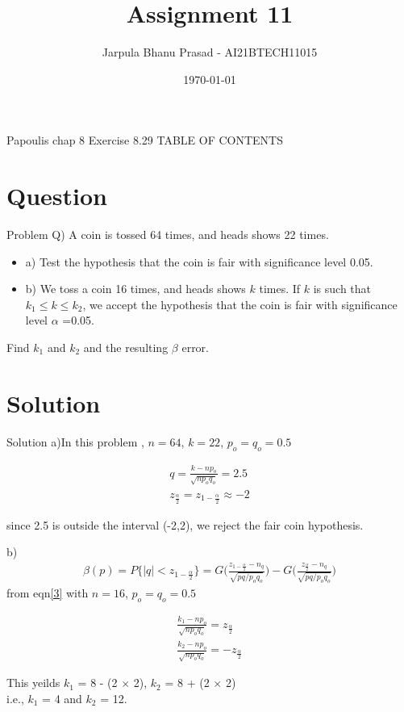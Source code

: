 \documentclass{beamer}
\title{Assignment 11}
\author{Jarpula Bhanu Prasad - AI21BTECH11015}
\date{\today}
\begin{document}
\begin{frame}
    \titlepage 
\end{frame}

\logo{}


\begin{frame}{Papoulis chap 8 Exercise 8.29}
TABLE OF CONTENTS
    \tableofcontents
\end{frame}


\section{Question}
\begin{frame}{Problem}
Q) A coin is tossed 64 times, and heads shows 22 times.
\begin{itemize}
    \item a) Test the hypothesis that the coin is fair with significance level 0.05.
    \item b) We toss a coin 16 times, and heads shows $k$ times. If $k$ is such that $k_1 \le k \le k_2$, we accept the hypothesis that the coin is fair with significance level $\alpha$ =0.05. 
\end{itemize}
Find $k_1$ and $k_2$ and the resulting $\beta$ error.
\end{frame}

\section{Solution}
\begin{frame}{Solution}
   a)In this problem , $n=64$, $k=22$, $p_o = q_o =0.5$

   \begin{align} 
       q = \frac{k-np_o}{\sqrt{np_oq_o}} = 2.5 \\
       z_{\frac{\alpha}{2}} =   z_{1-\frac{\alpha}{2}} \approx -2 
   \end{align}

   since 2.5 is outside the interval (-2,2), we reject the fair coin hypothesis.

\end{frame}

\begin{frame}
   b) \begin{align} \label{3}
       \beta(p) = P\{|q| < z_{1-\frac{\alpha}{2}} \} = G\big(\frac{z_{1-\frac{\alpha}{2}} -n_q}{\sqrt{pq/p_oq_o}} \big) - G\big(\frac{z_{\frac{\alpha}{2}} -n_q}{\sqrt{pq/p_oq_o}} \big)
   \end{align}
   from eqn\eqref{3} with $n=16$, $p_o = q_o = 0.5$

   \begin{align}
       \frac{k_1 - np_o}{\sqrt{np_oq_o}} = z_{\frac{\alpha}{2}} \\
       \frac{k_2 - np_o}{\sqrt{np_oq_o}} = - z_{\frac{\alpha}{2}}
   \end{align}

   This yeilds $k_1$ = 8 - (2 $\times$ 2), $k_2$ = 8 + (2 $\times$ 2) \\
   i.e., $k_1$ = 4 and $k_2$ = 12.

\end{frame}
\end{document}
